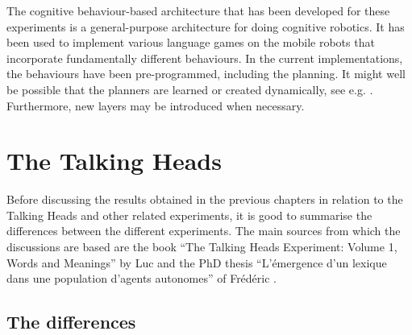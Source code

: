 The cognitive behaviour-based architecture that has been developed for these experiments is a general-purpose architecture for doing cognitive robotics. It has been used to implement various language games on the mobile robots that incorporate fundamentally different behaviours. In the current implementations, the behaviours have been pre-programmed, including the planning. It might well be possible that the planners are learned or created dynamically, see e.g. \citet{barnesetal:1997}. Furthermore, new layers may be introduced when necessary.


\section{The Talking Heads}\label{s:disc:th}

Before discussing the results obtained in the previous chapters in relation to the Talking Heads and other related experiments, it is good to summarise the differences between the different experiments. The main sources from which the discussions are based are the book ``The Talking Heads Experiment: Volume 1, Words and Meanings'' by Luc \citet{steels:2000} and the PhD thesis ``{L'\'emergence d'un lexique dans une population d'agents autonomes}'' of Fr\'ed\'eric \citet{kaplan:2000}.

\subsection{The differences}

